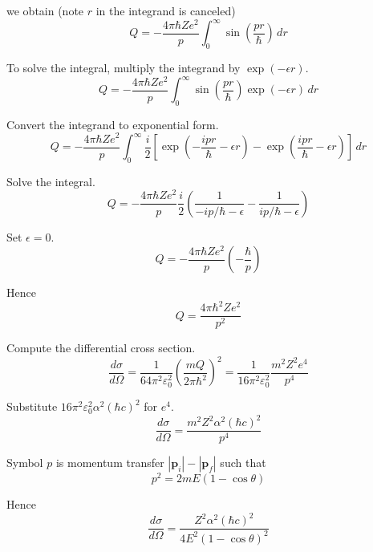 we obtain (note $r$ in the integrand is canceled)
\begin{equation*}
Q=-\frac{4\pi\hbar Ze^2}{p}
\int_0^\infty\sin\left(\frac{pr}{\hbar}\right)\,dr
\end{equation*}

To solve the integral, multiply the integrand by $\exp(-\epsilon r)$.
\begin{equation*}
Q=-\frac{4\pi\hbar Ze^2}{p}
\int_0^\infty\sin\left(\frac{pr}{\hbar}\right)\exp(-\epsilon r)\,dr
\end{equation*}

Convert the integrand to exponential form.
\begin{equation*}
Q=-\frac{4\pi\hbar Ze^2}{p}
\int_0^\infty\frac{i}{2}\left[
\exp\left(-\frac{ipr}{\hbar}-\epsilon r\right)
-\exp\left(\frac{ipr}{\hbar}-\epsilon r\right)
\right]\,dr
\end{equation*}

Solve the integral.
\begin{equation*}
Q=-\frac{4\pi\hbar Ze^2}{p}\frac{i}{2}
\left(\frac{1}{-ip/\hbar-\epsilon}-\frac{1}{ip/\hbar-\epsilon}\right)
\tag{1}
\end{equation*}

Set $\epsilon=0$.
\begin{equation*}
Q=-\frac{4\pi\hbar Ze^2}{p}\left(-\frac{\hbar}{p}\right)
\end{equation*}

Hence
\begin{equation*}
Q=\frac{4\pi\hbar^2Ze^2}{p^2}
\end{equation*}

Compute the differential cross section.
\begin{equation*}
\frac{d\sigma}{d\Omega}=\frac{1}{64\pi^2\varepsilon_0^2}\left(\frac{mQ}{2\pi\hbar^2}\right)^2
=\frac{1}{16\pi^2\varepsilon_0^2}\frac{m^2Z^2e^4}{p^4}
\tag{2}
\end{equation*}

Substitute $16\pi^2\varepsilon_0^2\alpha^2(\hbar c)^2$ for $e^4$.
\begin{equation*}
\frac{d\sigma}{d\Omega}=\frac{m^2Z^2\alpha^2(\hbar c)^2}{p^4}
\end{equation*}

Symbol $p$ is momentum transfer $|\mathbf p_i|-|\mathbf p_f|$ such that
\begin{equation*}
p^2=2mE(1-\cos\theta)
\end{equation*}

Hence
\begin{equation*}
\frac{d\sigma}{d\Omega}=\frac{Z^2\alpha^2(\hbar c)^2}{4E^2(1-\cos\theta)^2}
\tag{3}
\end{equation*}

